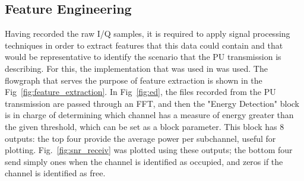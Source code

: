 \subsection{Feature Engineering}\label{ch:features}
Having recorded the raw I/Q samples, it is required to apply signal processing techniques in order to extract features that this data could contain and that would be representative to identify the scenario that the \ac{PU} transmission is describing. For this, the implementation that was used in \cite{Wunsch2017} was used. The flowgraph that serves the purpose of feature extraction is shown in the Fig~\ref{fig:feature_extraction}. In Fig~\ref{fig:ed}, the files recorded from the \ac{PU} transmission are passed through an \ac{FFT}, and then the "Energy Detection" block is in charge of determining which channel has a measure of energy greater than the given threshold, which can be set as a block parameter. This block has 8 outputs: the top four provide the average power per subchannel, useful for plotting. Fig.~\ref{fig:snr_receiv} was plotted using these outputs; the bottom four send simply ones when the channel is identified as occupied, and zeros if the channel is identified as free.

